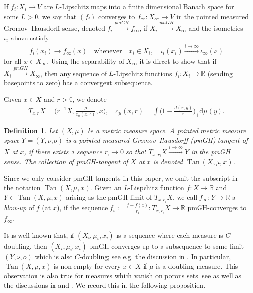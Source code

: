 \documentclass{amsart}
\newtheorem{definition}[theorem]{Definition}
\numberwithin{equation}{section}
\newcommand{\R}{\mathbb{R}}
\newcommand{\ud}{\mathrm {d}}
\newcommand{\inv}{^{-1}}
\newcommand{\Tan}{\operatorname{Tan}}
\begin{document}
If $f_i:X_i\to V$ are $L$-Lipschitz maps into a finite dimensional Banach space for some $L>0$, we say that $(f_i)$ converges to $f_\infty:X_\infty\to V$ in the pointed measured Gromov--Hausdorff sense, denoted $f_i\stackrel{pmGH}{\longrightarrow}f_\infty$, if $X_i\stackrel{pmGH}{\longrightarrow}X_\infty$ and the isometries $\iota_i$ above satisfy
\begin{align*}
f_i(x_i)\to f_\infty(x)\quad\mathrm{whenever}\quad x_i\in X_i,\quad \iota_i(x_i)\stackrel{i\to\infty}{\longrightarrow}\iota_\infty(x)
\end{align*}
for all $x\in X_\infty$. Using the separability of $X_\infty$ it is direct to show that if $X_i\stackrel{pmGH}{\longrightarrow}X_\infty$, then any sequence of $L$-Lipschitz functions $f_i:X_i\to \R$ (sending basepoints to zero) has a convergent subsequence. 


Given $x\in X$ and $r>0$, we denote 
\begin{align*}
    T_{x,r}X=\Big(r\inv X,\frac{\mu}{c_{\mu}(x,r)},x\Big),\quad c_\mu(x,r)=\int\Big(1-\frac{d(x,y)}{r}\Big)_+\ud\mu(y).
\end{align*}
\begin{definition}\label{def:tangent}
Let $(X,\mu)$ be a metric measure space. A pointed metric measure space $Y=(Y,\nu,o)$ is a pointed measured Gromov--Hausdorff (pmGH) tangent of $X$ at $x$, if there exists a sequence $r_i\to 0$ so that $T_{x,r_i}X\stackrel{i\to\infty}{\longrightarrow}Y$ in the pmGH sense. The collection of pmGH-tangent of $X$ at $x$ is denoted $\Tan(X,\mu,x)$. 
\end{definition}
Since we only consider pmGH-tangents in this paper, we omit the subscript in the notation $\Tan(X,\mu,x)$.  Given an $L$-Lispchitz function $f:X\to \R$ and $Y\in \Tan(X,\mu,x)$ arising as the pmGH-limit of $T_{x,r_i}X$, we call $f_\infty:Y\to\R$ a \emph{blow-up} of $f$ (at $x$), if the sequence $f_i:=\frac{f-f(x)}{r_i}:T_{x,r_i}X\to \R$ pmGH-converges to $f_\infty$.

It is well-known that, if $(X_i,\mu_i,x_i)$ is a sequence where each measure is $C$-doubling, then $(X_i,\mu_i,x_i)$ pmGH-converges up to a subsequence to some limit $(Y,\nu,o)$ which is also $C$-doubling; see e.g. the discussion in \cite[Lemma 3.32.]{gigconv}. In particular, $\Tan(X,\mu,x)$ is non-empty for every $x\in X$ if $\mu$ is a doubling measure. This observation is also true for measures which vanish on porous sets, see \cite[Theorem 1.5, Proposition 5.3]{soultaniscakovic} as well as the discussions in  \cite[Remark 3.13]{sch16a} and \cite[Remark 2.23]{CKS}. We record this in the following proposition.
\end{document}
